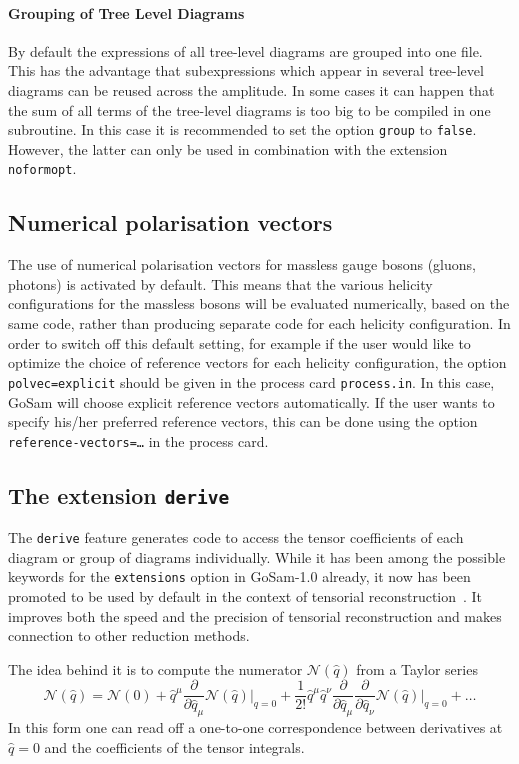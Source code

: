 \documentclass[11pt,a4paper]{refrep}
\newcommand{\gosam}{{\sc GoSam}\xspace}
\begin{document}
\paragraph{Grouping of Tree Level Diagrams}

By default the expressions of all tree-level diagrams are grouped into one
file. This has the advantage that subexpressions which appear in several
tree-level diagrams can be reused across the amplitude. In some cases
it can happen that the sum of all terms of the tree-level diagrams is too big
to be compiled in one subroutine. In this case it is recommended to set
the option \texttt{group} to \texttt{false}. 
However, the latter can only be used in combination with the extension {\tt noformopt}.

\subsection{Numerical polarisation vectors}
\label{sec:numpolvec}
The use of numerical polarisation vectors for massless gauge bosons
(gluons, photons) is activated by default.  This means that the
various helicity configurations for the massless bosons will be
evaluated numerically, based on the same code, rather than producing
separate code for each helicity configuration.  In order to switch off
this default setting,
for example if the user would like to 
optimize the choice of reference vectors for each helicity configuration,
the option {\tt polvec=explicit} should be given in the process card 
{\tt process.in}.
In this case, \gosam{} will choose explicit reference vectors automatically.
If the user wants to specify his/her preferred reference vectors, 
this can be done using the option {\tt reference-vectors=\ldots}
in the process card.

\subsection{The extension {\tt derive}}

The {\tt derive} feature generates code to access the tensor coefficients
of each diagram or group of diagrams individually.
While it has been among the possible keywords for the 
{\tt extensions} option in \gosam-1.0 already, it now has been promoted to 
be used by default in the context of  tensorial reconstruction~\cite{Heinrich:2010ax}.
It improves both the speed and the
precision of tensorial reconstruction and makes connection to other reduction methods.

The idea behind it is to compute the numerator $\mathcal{N}(\hat{q})$ 
from a Taylor series
\begin{equation}
\mathcal{N}(\hat{q})=\mathcal{N}(0)
+ \hat{q}^\mu
  \frac{\partial}{\partial\hat{q}_\mu}\mathcal{N}(\hat{q})\vert_{q=0}
+ \frac1{2!}\hat{q}^\mu\hat{q}^\nu
  \frac{\partial}{\partial\hat{q}_\mu}
  \frac{\partial}{\partial\hat{q}_\nu}
  \mathcal{N}(\hat{q})\vert_{q=0} + \ldots
\end{equation}
In this form one can read off a one-to-one correspondence between derivatives at
$\hat{q}=0$ and the coefficients of the tensor integrals.
\end{document}
